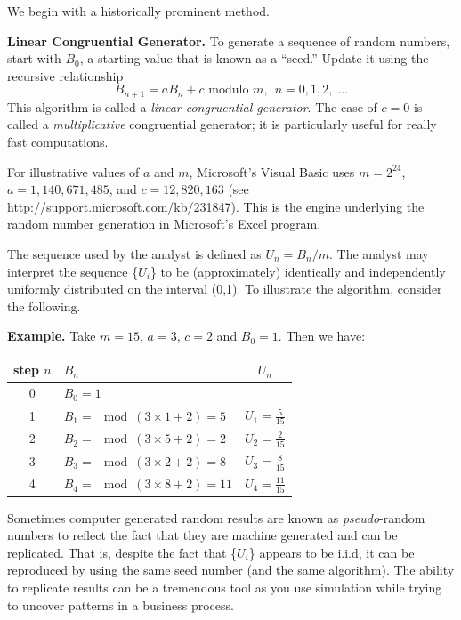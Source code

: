 \documentclass[]{book}
\begin{document}
We begin with a historically prominent method.

\textbf{Linear Congruential Generator.} To generate a sequence of random
numbers, start with \(B_0\), a starting value that is known as a
``seed.'' Update it using the recursive relationship
\[B_{n+1} = a B_n + c  \text{ modulo }m, ~~ n=0, 1, 2, \ldots .\] This
algorithm is called a \emph{linear congruential generator}. The case of
\(c=0\) is called a \emph{multiplicative} congruential generator; it is
particularly useful for really fast computations.

For illustrative values of \(a\) and \(m\), Microsoft's Visual Basic
uses \(m=2^{24}\), \(a=1,140,671,485\), and \(c = 12,820,163\) (see
\url{http://support.microsoft.com/kb/231847}). This is the engine
underlying the random number generation in Microsoft's Excel program.

The sequence used by the analyst is defined as \(U_n=B_n/m.\) The
analyst may interpret the sequence \{\(U_{i}\)\} to be (approximately)
identically and independently uniformly distributed on the interval
(0,1). To illustrate the algorithm, consider the following.

\textbf{Example.} Take \(m=15\), \(a=3\), \(c=2\) and \(B_0=1\). Then we
have:

\begin{longtable}[]{@{}clc@{}}
\toprule
step \(n\) & \(B_n\) & \(U_n\)\tabularnewline
\midrule
\endhead
\begin{minipage}[t]{0.32\columnwidth}\centering\strut
0\strut
\end{minipage} & \begin{minipage}[t]{0.32\columnwidth}\raggedright\strut
\(B_0=1\)\strut
\end{minipage} & \begin{minipage}[t]{0.32\columnwidth}\centering\strut
\strut
\end{minipage}\tabularnewline
1 & \(B_1 =\mod(3 \times 1 +2) = 5\) &
\(U_1 = \frac{5}{15}\)\tabularnewline
2 & \(B_2 =\mod(3 \times 5 +2) = 2\) &
\(U_2 = \frac{2}{15}\)\tabularnewline
3 & \(B_3 =\mod(3 \times 2 +2) = 8\) &
\(U_3 = \frac{8}{15}\)\tabularnewline
4 & \(B_4 =\mod(3 \times 8 +2) = 11\) &
\(U_4 = \frac{11}{15}\)\tabularnewline
\bottomrule
\end{longtable}

Sometimes computer generated random results are known as
\emph{pseudo}-random numbers to reflect the fact that they are machine
generated and can be replicated. That is, despite the fact that
\{\(U_{i}\)\} appears to be i.i.d, it can be reproduced by using the
same seed number (and the same algorithm). The ability to replicate
results can be a tremendous tool as you use simulation while trying to
uncover patterns in a business process.
\end{document}
